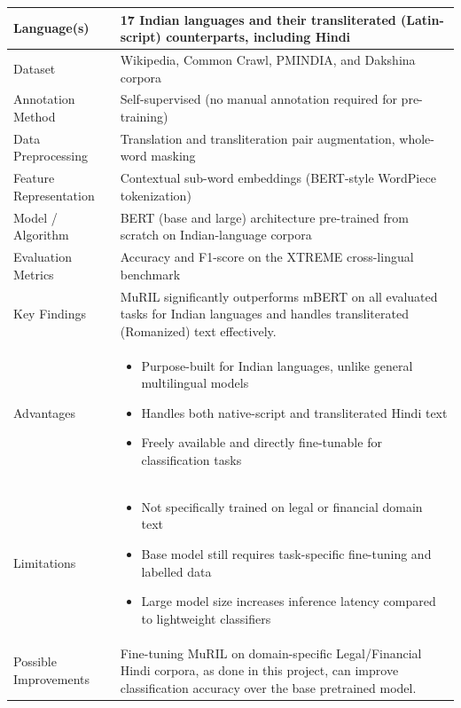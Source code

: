 \begin{longtable}{|p{5cm}|p{10cm}|}
Language(s) &
17 Indian languages and their transliterated (Latin-script) counterparts, including Hindi
\\ \hline

Dataset &
Wikipedia, Common Crawl, PMINDIA, and Dakshina corpora
\\ \hline

Annotation Method &
Self-supervised (no manual annotation required for pre-training)
\\ \hline

Data Preprocessing &
Translation and transliteration pair augmentation, whole-word masking
\\ \hline

Feature Representation &
Contextual sub-word embeddings (BERT-style WordPiece tokenization)
\\ \hline

Model / Algorithm &
BERT (base and large) architecture pre-trained from scratch on Indian-language corpora
\\ \hline

Evaluation Metrics &
Accuracy and F1-score on the XTREME cross-lingual benchmark
\\ \hline

Key Findings &
MuRIL significantly outperforms mBERT on all evaluated tasks for Indian languages and handles transliterated (Romanized) text effectively.
\\ \hline

Advantages &
\begin{itemize}
\item Purpose-built for Indian languages, unlike general multilingual models
\item Handles both native-script and transliterated Hindi text
\item Freely available and directly fine-tunable for classification tasks
\end{itemize}
\\ \hline

Limitations &
\begin{itemize}
\item Not specifically trained on legal or financial domain text
\item Base model still requires task-specific fine-tuning and labelled data
\item Large model size increases inference latency compared to lightweight classifiers
\end{itemize}
\\ \hline

Possible Improvements &
Fine-tuning MuRIL on domain-specific Legal/Financial Hindi corpora, as done in this project, can improve classification accuracy over the base pretrained model.
\\ \hline

\end{longtable}



